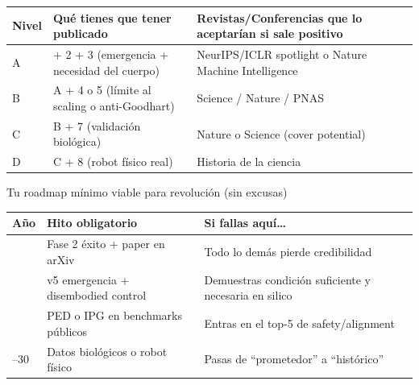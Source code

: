 {\def\LTcaptype{none} %
\begin{longtable}[]{@{}
  >{\raggedright\arraybackslash}p{}
  >{\raggedright\arraybackslash}p{}
  >{\raggedright\arraybackslash}p{}@{}}
\toprule\noalign{}
\begin{minipage}[b]{\linewidth}\raggedright
\textbf{Nivel}
\end{minipage} & \begin{minipage}[b]{\linewidth}\raggedright
\textbf{Qué tienes que tener publicado}
\end{minipage} & \begin{minipage}[b]{\linewidth}\raggedright
\textbf{Revistas/Conferencias que lo aceptarían si sale positivo}
\end{minipage} \\
\midrule\noalign{}
\endhead
\bottomrule\noalign{}
\endlastfoot
A & 1 + 2 + 3 (emergencia + necesidad del cuerpo) & NeurIPS/ICLR
spotlight o Nature Machine Intelligence \\
B & A + 4 o 5 (límite al scaling o anti-Goodhart) & Science / Nature /
PNAS \\
C & B + 7 (validación biológica) & Nature o Science (cover potential) \\
D & C + 8 (robot físico real) & Historia de la ciencia \\
\end{longtable}
}

Tu roadmap mínimo viable para revolución (sin excusas)

{\def\LTcaptype{none} %
\begin{longtable}[]{@{}
  >{\raggedright\arraybackslash}p{}
  >{\raggedright\arraybackslash}p{}
  >{\raggedright\arraybackslash}p{}@{}}
\toprule\noalign{}
\begin{minipage}[b]{\linewidth}\raggedright
\textbf{Año}
\end{minipage} & \begin{minipage}[b]{\linewidth}\raggedright
\textbf{Hito obligatorio}
\end{minipage} & \begin{minipage}[b]{\linewidth}\raggedright
\textbf{Si fallas aquí\ldots{}}
\end{minipage} \\
\midrule\noalign{}
\endhead
\bottomrule\noalign{}
\endlastfoot
2025 & Fase 2 éxito + paper en arXiv & Todo lo demás pierde
credibilidad \\
2026 & v5 emergencia + disembodied control & Demuestras condición
suficiente y necesaria en silico \\
2027 & PED o IPG en benchmarks públicos & Entras en el top-5 de
safety/alignment \\
2028--30 & Datos biológicos o robot físico & Pasas de ``prometedor'' a
``histórico'' \\
\end{longtable}
}
